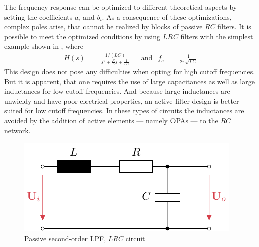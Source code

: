 The frequency response can be optimized to different theoretical aspects by setting the coefficients $a_i$ and $b_i$. As a consequence of these optimizations, complex poles arise, that cannot be realized by blocks of passive $RC$ filters. It is possible to meet the optimized conditions by using $LRC$ filters with the simplest example shown in , where
\begin{align}
  H(s) &= \frac{1/(LC)}{s^2+\frac{R}{L}s+\frac{1}{LC}} &&\text{and} &f_c &= \frac{1}{2\pi\sqrt{LC}}
\end{align}
This design does not pose any difficulties when opting for high cutoff frequencies. But it is apparent, that one requires the use of large capacitances as well as large inductances for low cutoff frequencies. And because large inductances are unwieldy and have poor electrical properties, an active filter design is better suited for low cutoff frequencies. In these types of circuits the inductances are avoided by the addition of active elements --- namely \ac{OPA}s --- to the $RC$ network.

\begin{figure}[htb!]
  \centering
  \includegraphics[scale=1]{figures/electronics/lowpass/lp_passive_2ord/lp_passive_2ord}
  \caption[Passive second-order \ac{LPF}]{Passive second-order \ac{LPF}, $LRC$ circuit%
    \label{fig:lp_passive_2ord}}
\end{figure}


